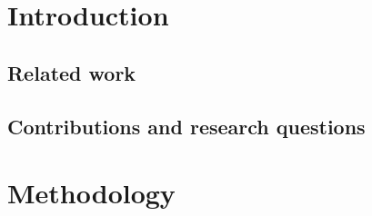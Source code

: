 \documentclass[a4paper,fleqn]{cas-dc}
\begin{document}
\section{Introduction}
\label{sec:introduction}


\subsection{Related work}


\subsection{Contributions and research questions}

\section{Methodology}
\label{sec:methodology}
\end{document}
